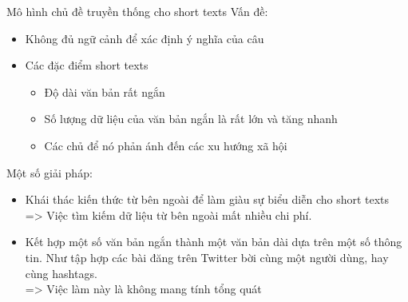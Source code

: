 \documentclass[pdf]{beamer}
\begin{document}
\begin{frame}{Mô hình chủ đề truyền thống cho short texts}
Vấn đề: 
	\begin{itemize}
		\item Không đủ ngữ cảnh để xác định ý nghĩa của câu
		\item Các đặc điểm short texts
		\begin{itemize}
			\item Độ dài văn bản rất ngắn
			\item Số lượng dữ liệu của văn bản ngắn là rất lớn và tăng nhanh
			\item Các chủ để nó phản ánh đến các xu hướng xã hội
		\end{itemize}
	\end{itemize}		

	Một số giải pháp:
	\begin{itemize}
		\item Khái thác kiến thức từ bên ngoài để làm giàu sự biểu diễn cho short texts\\
		=> Việc tìm kiếm dữ liệu từ bên ngoài mất nhiều chi phí.
		\item Kết hợp một số văn bản ngắn thành một văn bản dài dựa trên một số thông tin. Như tập hợp các bài đăng trên Twitter bời cùng một người dùng, hay cùng hashtags.
		\\=> Việc làm này là không mang tính tổng quát
	\end{itemize}

\end{frame}
\end{document}
